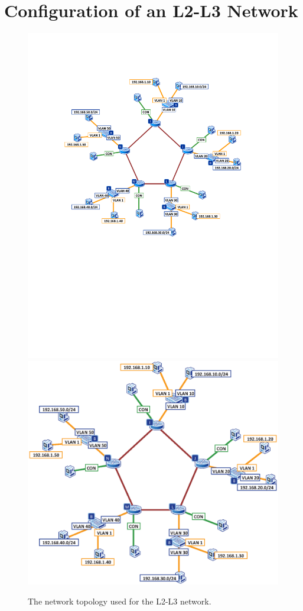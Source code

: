 \section{Configuration of an L2-L3 Network}

\begin{figure}
\centering
\ifpdf
\includegraphics[width=0.9\linewidth]{Figures/RoutingSwitches.pdf}
\else
\includegraphics[width=0.9\linewidth]{Figures/RoutingSwitches.eps}
\fi
\caption{The network topology used for the L2-L3 network.}
\label{fig:RoutingSwitches}
\end{figure}

